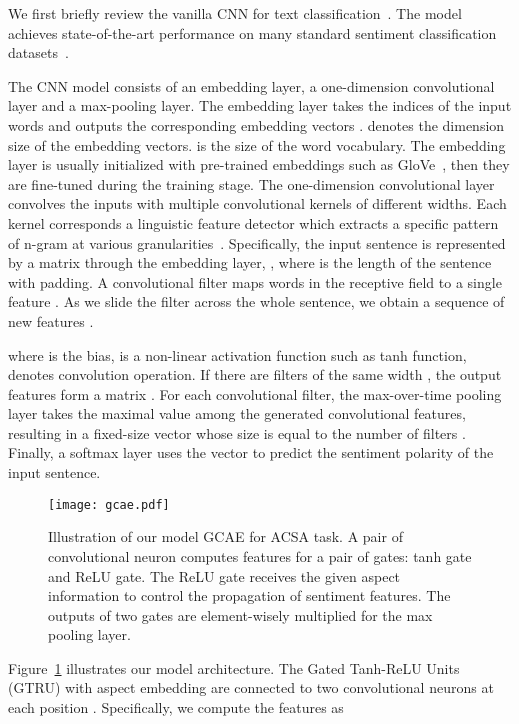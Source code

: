 \documentclass[11pt,a4paper]{article}
\begin{document}
We first briefly review the vanilla CNN for text classification~\cite{Kim:2014vt}. The model achieves state-of-the-art performance on many standard sentiment classification datasets~\cite{Le:2017vg}.

The CNN model consists of an embedding layer, a one-dimension convolutional layer and a max-pooling layer.
The embedding layer takes the indices  of the input words and outputs the corresponding embedding vectors .  denotes the dimension size of the embedding vectors.  is the size of the word vocabulary. The embedding layer is usually initialized with pre-trained embeddings such as GloVe~\cite{Pennington:2014uw}, then they are fine-tuned during the training stage. 
The one-dimension convolutional layer convolves the inputs with multiple convolutional kernels of different widths. Each kernel corresponds a linguistic feature detector which extracts a specific pattern of n-gram at various granularities~\cite{Kalchbrenner:2014wl}.
Specifically, the input sentence is represented by a matrix through the embedding layer, , where  is the length of the sentence with padding. A convolutional filter  maps  words in the receptive field to a single feature . As we slide the filter across the whole sentence, we obtain a sequence of new features .

where  is the bias,  is a non-linear activation function such as tanh function,  denotes convolution operation. If there are  filters of the same width , the output features form a matrix . For each convolutional filter, the max-over-time pooling layer takes the maximal value among the generated convolutional features, resulting in a fixed-size vector whose size is equal to the number of filters . Finally, a softmax layer uses the vector to predict the sentiment polarity of the input sentence.

\begin{figure}
\centering
  \texttt{[image: gcae.pdf]}
\caption{Illustration of our model GCAE for ACSA task. A pair of convolutional neuron computes features for a pair of gates: tanh gate and ReLU gate. The ReLU gate receives the given aspect information to control the propagation of sentiment features. The outputs of two gates are element-wisely multiplied for the max pooling layer.}
\label{fig:model}
\end{figure}

Figure~\ref{fig:model} illustrates our model architecture. The Gated Tanh-ReLU Units (GTRU) with aspect embedding are connected to two convolutional neurons at each position . Specifically, we compute the features  as
\end{document}
